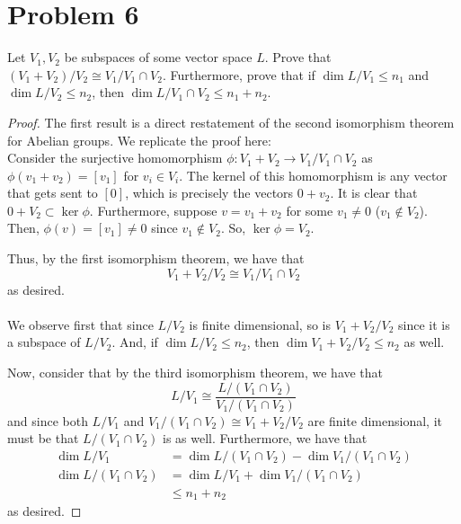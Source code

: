 \documentclass[fontsize=11pt]{scrartcl} %
\numberwithin{equation}{section} %
\numberwithin{figure}{section} %
\numberwithin{table}{section} %
\begin{document}
\newpage

\section*{Problem 6}
Let $V_1,V_2$ be subspaces of some vector space $L$. Prove that
$(V_1+V_2)/{V_2}\cong V_1/{V_1\cap V_2}$. Furthermore, prove that if
$\dim L/{V_1} \leq n_1$ and $\dim L/{V_2}\leq n_2$, then
$\dim L/{V_1\cap V_2}\leq n_1+n_2$.
\\
\begin{proof}
The first result is a direct restatement of the second isomorphism theorem for
    Abelian groups. We replicate the proof here:
    \\
    Consider the surjective homomorphism $\phi:V_1+V_2\to V_1/{V_1\cap V_2}$
    as $\phi(v_1+v_2) = [v_1]$ for $v_i\in V_i$. The kernel of this homomorphism
    is any vector that gets sent to $[0]$, which is precisely the vectors
    $0+v_2$. It is clear that $0+V_2\subset \ker\phi$. Furthermore, suppose
    $v=v_1+v_2$ for some $v_1\neq 0$ ($v_1\not\in V_2$). Then,
    $\phi(v) = [v_1] \neq 0$ since $v_1\not\in V_2$. So, $\ker\phi=V_2$.

    Thus, by the first isomorphism theorem, we have that
    \[
        V_1+V_2/{V_2} \cong V_1/{V_1\cap V_2}
    \]
    as desired.
    \\
    \\
    We observe first that since $L/{V_2}$ is finite dimensional, so is
    $V_1+V_2/{V_2}$ since it is a subspace of $L/{V_2}$. And, if $\dim
    L/{V_2}\leq n_2$, then $\dim V_1+V_2/{V_2}\leq n_2$ as well.

    Now, consider that by the third isomorphism theorem, we have that
    \[
        L/{V_1} \cong \frac{L/{(V_1\cap V_2)}}{V_1/{(V_1\cap V_2)}}
    \]
    and since both $L/{V_1}$ and $V_1/{(V_1\cap V_2)}\cong V_1+V_2/{V_2}$ are
    finite dimensional, it must be that $L/{(V_1\cap V_2)}$ is as well.
    Furthermore, we have that
    \[
        \begin{aligned}
            \dim L/{V_1} &= \dim L/{(V_1\cap V_2)} - \dim V_1/{(V_1\cap V_2)}\\
            \dim L/{(V_1\cap V_2)} &= \dim L/{V_1} + \dim V_1/{(V_1\cap V_2)}\\
                                   &\leq n_1 + n_2
        \end{aligned}
    \]
    as desired.
\end{proof}
\end{document}
